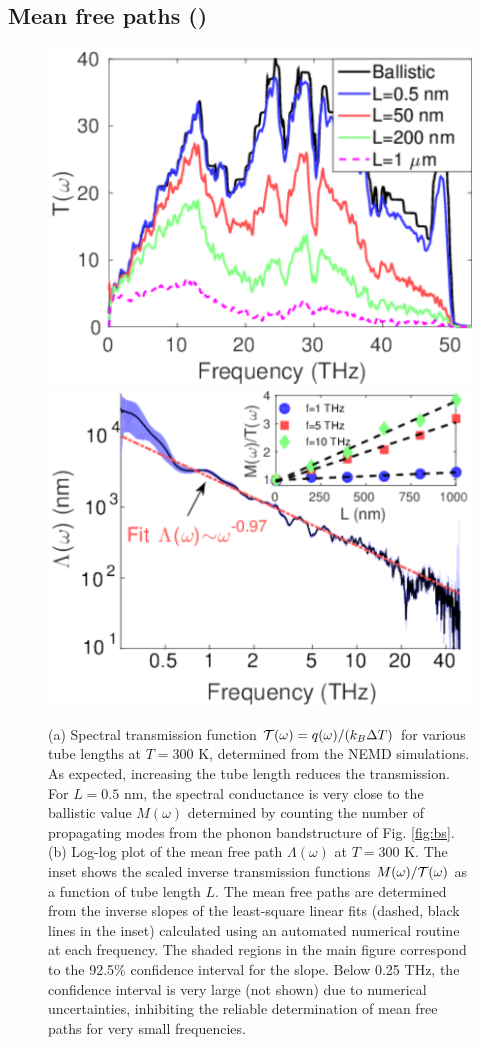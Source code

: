 \subsection{Mean free paths ()}

\begin{figure}[tb]
 \begin{center}
  \includegraphics[width=.49\columnwidth]{pics/cnt_fig2.pdf} 
  \includegraphics[width=.49\columnwidth]{pics/cnt_fig4.pdf} 
  \caption{(a) Spectral transmission function $\mathcal{T}(\omega)=q(\omega)/(k_B\Delta T)$ for various tube lengths at $T=300$ K, determined from the NEMD simulations. As expected, increasing the tube length reduces the transmission. For $L=0.5$ nm, the spectral conductance is very close to the ballistic value $M(\omega)$ determined by counting the number of propagating modes from the phonon bandstructure of Fig. \ref{fig:bs}. (b) Log-log plot of the mean free path $\Lambda(\omega)$ at $T=300$ K. The inset shows the scaled inverse transmission functions $M(\omega)/\mathcal{T}(\omega)$ as a function of tube length $L$. The mean free paths are determined from the inverse slopes of the least-square linear fits (dashed, black lines in the inset) calculated using an automated numerical routine at each frequency. The shaded regions in the main figure correspond to the 92.5\% confidence interval for the slope. Below 0.25 THz, the confidence interval is very large (not shown) due to numerical uncertainties, inhibiting the reliable determination of mean free paths for very small frequencies.}  
\label{fig:cnt_fig2}
 \end{center}
\end{figure}

